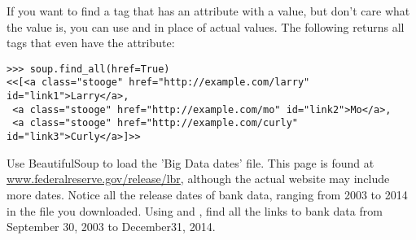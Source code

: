 If you want to find a tag that has an attribute with a value, but don't care what the value is, you can use  and  in place of actual values.
The following returns all tags that even have the  attribute:
\begin{lstlisting}
>>> soup.find_all(href=True)
<<[<a class="stooge" href="http://example.com/larry" id="link1">Larry</a>,
 <a class="stooge" href="http://example.com/mo" id="link2">Mo</a>,
 <a class="stooge" href="http://example.com/curly" id="link3">Curly</a>]>>
\end{lstlisting}

\begin{problem}

Use BeautifulSoup to load the 'Big Data dates' file.
This page is found at \url{www.federalreserve.gov/release/lbr}, although the actual website may include more dates.
Notice all the release dates of bank data, ranging from 2003 to 2014 in the file you downloaded.
Using  and , find all the links to bank data from September 30, 2003 to December31, 2014.

\end{problem}